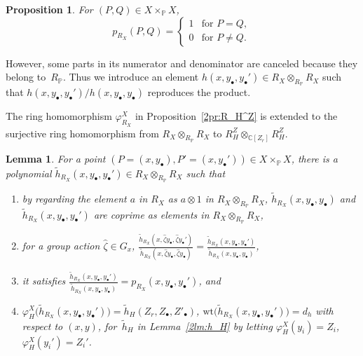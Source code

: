 \documentclass[10pt,a4paper]{amsart}
\def\CC{{\mathbb C}}
\def\PP{{\mathbb P}}
\def\th{{\widetilde h}}
\def\hzeta{{\widehat \zeta}}
\def\wt{{\mathrm {wt}}}
\numberwithin{equation}{section}
\newtheorem{Lemma}[Theorem]{Lemma}
\newtheorem{Proposition}[Theorem]{Proposition}
 { \theoremstyle{definition}
\newtheorem{Definition}[Theorem]{Definition}
\newtheorem{Note}[Theorem]{Note}
\newtheorem{Example}[Theorem]{Example}
\newtheorem{Remark}[Theorem]{Remark} }
\begin{document}
\begin{Proposition}\label{2pr:p_varpi0}
For $(P,Q) \in X \times_\PP X$,
\[
p_{R_X}(P,Q)=
\begin{cases}
1 & \text{for } P = Q,\\
0 & \text{for } P \neq Q.
\end{cases}
\]
\end{Proposition}

However, some parts in its numerator and denominator are canceled because they belong to~$R_\PP$.
Thus we introduce an element $h(x, y_\bullet, y_\bullet') \in R_X\otimes_{R_\PP} R_X$ such that $h(x, y_\bullet, y_\bullet') /h(x, y_\bullet, y_\bullet)$
reproduces the product.

The ring homomorphism $\varphi^X_{R_X}$ in Proposition~\ref{2pr:R_H^Z} is extended to the surjective ring homomorphism from $R_X\otimes_{R_\PP}R_X$ to $R_H^Z\otimes_{\CC[Z_r]}R_H^Z$.

\begin{Lemma}\label{2lm:h_RXe}
For a point $(P = (x, y_\bullet), P'=(x, y_\bullet'))\in X \times_\PP X$, there is a polynomial $\th_{R_X}(x, y_{\bullet}, y_{\bullet}')\in R_X \otimes_{R_\PP} R_X$ such that
\begin{enumerate}\itemsep=0pt
\item[$(1)$] by regarding the element $a$ in $R_X$ as
$a\otimes 1$ in $R_X \otimes_{R_\PP} R_X$,
$\th_{R_X}(x, y_{\bullet}, y_{\bullet})$ and
$\th_{R_X}(x, y_{\bullet}, y_{\bullet}')$ are coprime
as elements in $R_X \otimes_{R_\PP} R_X$,

\item[$(2)$] for a group action $\hzeta \in G_x$,
$ \frac{\th_{R_X}(x, \hzeta y_{\bullet}, \hzeta y_{\bullet}')}
{\th_{R_X}(x, \hzeta y_{\bullet}, \hzeta y_{\bullet})}=
 \frac{\th_{R_X}(x, y_{\bullet}, y_{\bullet}')}
{\th_{R_X}(x, y_{\bullet}, y_{\bullet})}$,

\item[$(3)$] it satisfies
$\frac{\th_{R_X}(x, y_{\bullet}, y_{\bullet}')}
{\th_{R_X}(x, y_{\bullet}, y_{\bullet})}=
p_{R_X}(x, y_{\bullet}, y_{\bullet}')$, and

\item[$(4)$]
$\varphi_H^X\big(\th_{R_X}(x, y_{\bullet}, y_{\bullet}')\big)
=\th_H(Z_r, Z_\bullet, Z'_\bullet)
$, $\wt\big(\th_{R_X}(x, y_{\bullet}, y_{\bullet}')\big)=d_h$
with respect to $(x,y)$,
for~$\th_{H}$ in Lemma~{\rm \ref{2lm:h_H}}
by letting $\varphi_H^X(y_i) =Z_i$, $\varphi_H^X(y_i') =Z_i'$.
\end{enumerate}
\end{Lemma}
\end{document}
